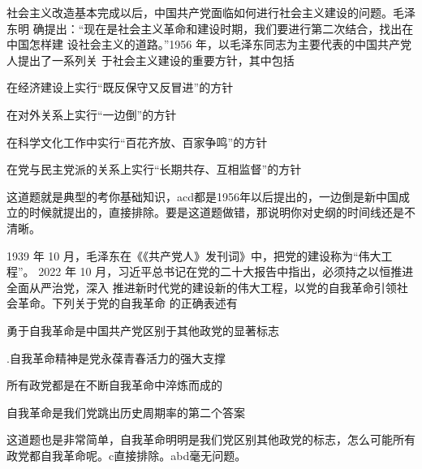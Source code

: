 \documentclass[lang=cn,newtx,10pt,scheme=chinese,pad,twocol]{zznote}
\begin{document}
\begin{exercise}社会主义改造基本完成以后，中国共产党面临如何进行社会主义建设的问题。毛泽东明 确提出：“现在是社会主义革命和建设时期，我们要进行第二次结合，找出在 中国怎样建 设社会主义的道路。”1956 年，以毛泽东同志为主要代表的中国共产党人提出了一系列关 于社会主义建设的重要方针，其中包括
	\begin{choice}
		\item 在经济建设上实行“既反保守又反冒进”的方针
		\item 在对外关系上实行“一边倒”的方针
		\item 在科学文化工作中实行“百花齐放、百家争鸣”的方针
		\item 在党与民主党派的关系上实行“长期共存、互相监督”的方针
	\end{choice}
\end{exercise}
\begin{solution}
	这道题就是典型的考你基础知识，acd都是1956年以后提出的，一边倒是新中国成立的时候就提出的，直接排除。要是这道题做错，那说明你对史纲的时间线还是不清晰。
\end{solution}

\begin{exercise}1939 年 10 月，毛泽东在《《共产党人》发刊词》中，把党的建设称为“伟大工程”。 2022 年 10 月，习近平总书记在党的二十大报告中指出，必须持之以恒推进全面从严治党，深入 推进新时代党的建设新的伟大工程，以党的自我革命引领社会革命。下列关于党的自我革命 的正确表述有
	\begin{choice}
		\item 勇于自我革命是中国共产党区别于其他政党的显著标志
		\item .自我革命精神是党永葆青春活力的强大支撑
		\item 所有政党都是在不断自我革命中淬炼而成的
		\item 自我革命是我们党跳出历史周期率的第二个答案
	\end{choice}
\end{exercise}
\begin{solution}
	这道题也是非常简单，自我革命明明是我们党区别其他政党的标志，怎么可能所有政党都自我革命呢。c直接排除。abd毫无问题。
\end{solution}
\end{document}

